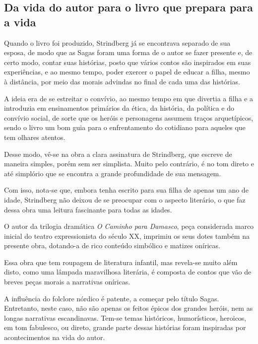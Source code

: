 \documentclass[12pt]{extarticle}
\begin{document}
\subsection{Da vida do autor para o livro que prepara para a vida}

Quando o livro foi produzido, Strindberg já se encontrava separado de
sua esposa, de modo que as Sagas foram uma forma de o autor se fazer
presente e, de certo modo, contar suas histórias, posto que vários
contos são inspirados em suas experiências, e ao mesmo tempo, poder
exercer o papel de educar a filha, mesmo à distância, por meio das
morais advindas no final de cada uma das histórias.




A ideia era de se estreitar o convívio, ao mesmo tempo em que divertia a
filha e a introduzia em ensinamentos primários da ética, da história, da
política e do convívio social, de sorte que os heróis e personagens
assumem traços arquetípicos, sendo o livro um bom guia para o
enfrentamento do cotidiano para aqueles que tem olhares atentos.

Desse modo, vê-se na obra a clara assinatura de Strindberg, que escreve
de maneira simples, porém sem ser simplista. Muito pelo contrário, é no
tom direto e até simplório que se encontra a grande profundidade de sua
mensagem.

Com isso, nota-se que, embora tenha escrito para sua filha de apenas um
ano de idade, Strindberg não deixou de se preocupar com o aspecto
literário, o que faz dessa obra uma leitura fascinante para todas as
idades.




O autor da trilogia dramática \emph{O Caminho para Damasco}, peça
considerada marco inicial do teatro expressionista do século XX,
imprimiu os seus dotes também na presente obra, dotando-a de rico
conteúdo simbólico e matizes oníricas.

Essa obra que tem roupagem de literatura infantil, mas revela-se muito
além disto, como uma lâmpada maravilhosa literária, é composta de contos
que vão de breves peças morais a narrativas oníricas.

A influência do folclore nórdico é patente, a começar pelo título Sagas.
Entretanto, neste caso, não são apenas os feitos épicos dos grandes
heróis, nem as longas narrativas escandinavas. Tem-se temas históricos,
humorísticos, heroicos, em tom fabulesco, ou direto, grande parte dessas
histórias foram inspiradas por acontecimentos na vida do autor.
\end{document}
